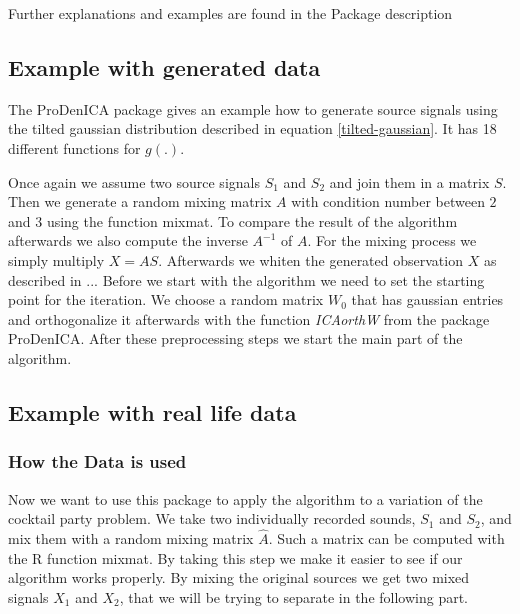 \documentclass[12pt, a4paper]{article}
\numberwithin{equation}{section}
\numberwithin{figure}{section}
\numberwithin{table}{section}
\begin{document}
	Further explanations and examples are found in the Package description \citep{prodenica-doku}
	
	\subsection{Example with generated data}
	
	The ProDenICA package gives an example how to generate source signals using the tilted gaussian distribution described in equation \ref{tilted-gaussian}.
	It has 18 %
	different functions for \mbox{$g(.)$}. %
	
	Once again we assume two source signals \mbox{$S_1$} and \mbox{$S_2$} and join them in a matrix $S$.
	Then we generate a random mixing matrix $A$ with condition number between $2$ and $3$ %
	using the function mixmat.
	To compare the result of the algorithm afterwards we also compute the inverse $A^{-1}$ of $A$.
	For the mixing process we simply multiply \mbox{$X=AS$}.
	Afterwards we whiten the generated observation $X$ as described in ... %
	Before we start with the algorithm we need to set the starting point for the iteration.
	We choose a random matrix \mbox{$W_0$} that has gaussian entries and orthogonalize it afterwards with the function \textit{ICAorthW} from the package ProDenICA.
	After these preprocessing steps we start the main part of the algorithm.
	
	
	\subsection{Example with real life data}
	\subsubsection{How the Data is used}
	Now we want to use this package to apply the algorithm to a variation of the cocktail party problem.
	We take two individually recorded sounds, \mbox{$S_1$} and \mbox{$S_2$}, and mix them with a random mixing matrix \mbox{$\hat{A}$}.
	Such a matrix can be computed with the R function mixmat. %
	By taking this step we make it easier to see if our algorithm works properly. %
	By mixing the original sources we get two mixed signals \mbox{$X_1$} and \mbox{$X_2$}, that we will be trying to separate in the following part.
	
\end{document}
